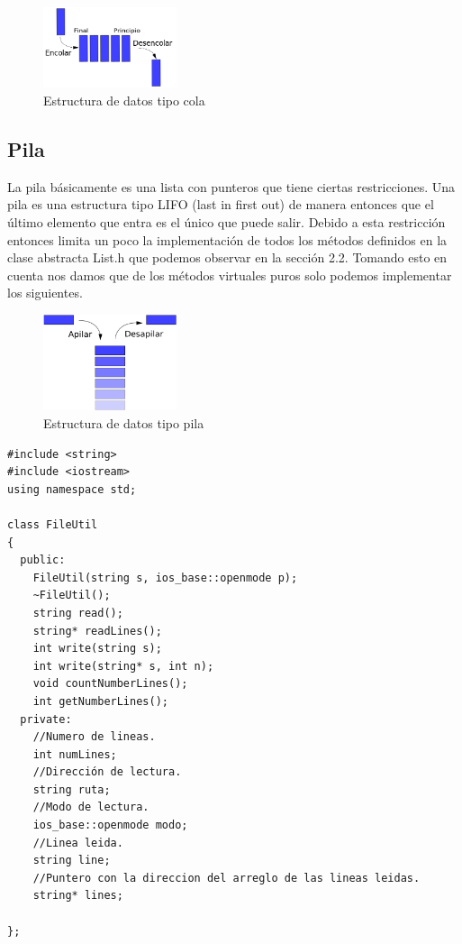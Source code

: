 \begin{figure}[H]
\centering
\includegraphics[width=0.35\textwidth]{imgs/Labo8/cola.png}
\caption{Estructura de datos tipo cola}
\label{fig:cola}
\end{figure}

\subsection{Pila}

La pila básicamente es una lista con punteros que tiene ciertas restricciones. Una pila es una estructura tipo LIFO (last in first out) de manera entonces que el último elemento que entra es el único que puede salir. Debido a esta restricción entonces limita un poco la implementación de todos los métodos definidos en la clase abstracta List.h que podemos observar en la sección 2.2. Tomando esto en cuenta nos damos que de los métodos virtuales puros solo podemos implementar los siguientes.

\begin{figure}[H]
\centering
\includegraphics[width=0.35\textwidth]{imgs/Labo8/pila.png}
\caption{Estructura de datos tipo pila}
\label{fig:pila}
\end{figure}



\begin{verbatim}
#include <string>
#include <iostream>
using namespace std;

class FileUtil
{
  public:
  	FileUtil(string s, ios_base::openmode p);
  	~FileUtil();
  	string read();
  	string* readLines();
  	int write(string s);
  	int write(string* s, int n);
    void countNumberLines();
    int getNumberLines();
  private:
    //Numero de lineas.
    int numLines;
    //Dirección de lectura.
    string ruta;
    //Modo de lectura.
  	ios_base::openmode modo;
    //Linea leida.
    string line;
    //Puntero con la direccion del arreglo de las lineas leidas.
    string* lines;

};
\end{verbatim}

